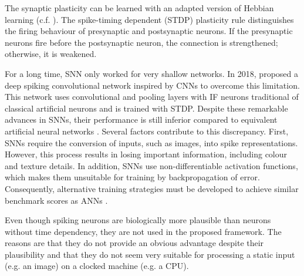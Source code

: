 The synaptic plasticity can be learned with an adapted version of Hebbian learning (c.f. ).
The spike-timing dependent (STDP) plasticity rule  distinguishes the firing behaviour of presynaptic and postsynaptic neurons.
If the presynaptic neurons fire before the postsynaptic neuron, the connection is strengthened; otherwise, it is weakened.

For a long time, SNN only worked for very shallow networks.
In 2018,  proposed a deep spiking convolutional network inspired by CNNs to overcome this limitation.
This network uses convolutional and pooling layers with IF neurons traditional of classical artificial neurons and is trained with STDP.
Despite these remarkable advances in SNNs, their performance is still inferior compared to equivalent artificial neural networks . Several factors contribute to this discrepancy. First, SNNs require the conversion of inputs, such as images, into spike representations.
However, this process results in losing important information, including colour and texture details. In addition, SNNs use non-differentiable activation functions, which makes them unsuitable for training by backpropagation of error. Consequently, alternative training strategies must be developed to achieve similar benchmark scores as ANNs \cite{nunes_spiking_2022}.

Even though spiking neurons are biologically more plausible than neurons without time dependency, they are not used in the proposed framework.
The reasons are that they do not provide an obvious advantage despite their plausibility and that they do not seem very suitable for processing a static input (e.g. an image) on a clocked machine (e.g. a CPU).


